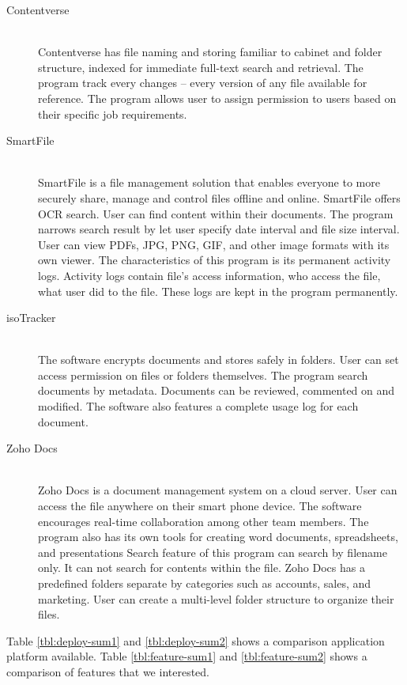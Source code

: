 \begin{description}
\item[Contentverse] \hfill \\
Contentverse has file naming and storing familiar to cabinet and folder structure, indexed for immediate full-text search and retrieval.
The program track every changes -- every version of any file available for reference.
The program allows user to assign permission to users based on their specific job requirements.

\item[SmartFile] \hfill \\
SmartFile is a file management solution that enables everyone to more securely share, manage and control files offline and online.
SmartFile offers \gls{OCR} search.
User can find content within their documents.
The program narrows search result by let user specify date interval and file size interval.
User can view PDFs, JPG, PNG, GIF, and other image formats with its own viewer.
The characteristics of this program is its permanent activity logs.
Activity logs contain file's access information, who access the file, what user did to the file.
These logs are kept in the program permanently.

\item[isoTracker] \hfill \\
The software encrypts documents and stores safely in folders.
User can set access permission on files or folders themselves.
The program search documents by metadata.
Documents can be reviewed, commented on and modified. The software also features a complete usage log for each document.

\item[Zoho Docs] \hfill \\
Zoho Docs is a document management system on a cloud server.
User can access the file anywhere on their smart phone device.
The software encourages real-time collaboration among other team members.
The program also has its own tools for creating word documents, spreadsheets, and presentations
Search feature of this program can search by filename only.
It can not search for contents within the file.
Zoho Docs has a predefined folders separate by categories such as accounts, sales, and marketing.
User can create a multi-level folder structure to organize their files.
\end{description}

Table \ref{tbl:deploy-sum1} and \ref{tbl:deploy-sum2} shows a comparison application platform available.
Table \ref{tbl:feature-sum1} and \ref{tbl:feature-sum2} shows a comparison of features that we interested.

